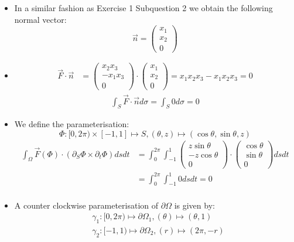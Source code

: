 \documentclass[11pt]{article}
\begin{document}
\begin{solution}     
    \begin{itemize}
    \item
    In a similar fashion as Exercise 1 Subquestion 2 we obtain the following normal vector:
		$$\vec{n} = \begin{pmatrix} x_1\\x_2\\0 \end{pmatrix}$$
    \item 
	\begin{align*}
	\vec F \cdot \vec n & = \begin{pmatrix}x_2x_3 \\ -x_1x_3\\0\end{pmatrix}\cdot \begin{pmatrix}x_1 \\ x_2\\0\end{pmatrix} = x_1x_2x_3 - x_1x_2x_3 = 0
	\end{align*}
	\begin{align*}
        \int_S \vec F \cdot \vec{n}d\sigma = \int_S 0 d\sigma = 0
     \end{align*}
    \item
    We define the parameterisation: 
	$$
	\Phi: [0,2\pi) \times [-1,1] \mapsto S, (\theta ,z) \mapsto (\cos\theta, \sin\theta ,z)
	$$
	\begin{align*}
        \int_\Omega \vec F(\Phi) \cdot ( \partial_S \Phi \times \partial_t \Phi ) dsdt &=\int_0^{2\pi} \int_{-1}^1 \begin{pmatrix}z\sin\theta\\ -z\cos\theta \\ 0\end{pmatrix} \cdot \begin{pmatrix}\cos\theta\\ \sin\theta \\ 0\end{pmatrix} dsdt \\
	    & = \int_0^{2\pi} \int_{-1}^1 0  dsdt  = 0\\
     \end{align*}
    \item 
    A counter clockwise parameterisation of $\partial \Omega$ is given by:
	\begin{align*}
	&\gamma_1: [0,2\pi) \mapsto \partial \Omega_1, (\theta) \mapsto (\theta, 1)\\
	&\gamma_2: [-1,1) \mapsto \partial \Omega_2, (r) \mapsto (2\pi, -r)\\

\end{align*}
\end{itemize}
\end{solution}
\end{document}

